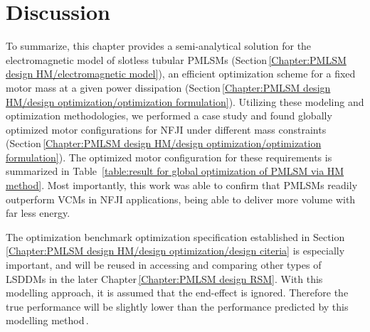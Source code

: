     \section{Discussion}                            \label{Chapter:PMLSM design HM/discussion}
    
        
        To summarize, this chapter provides a semi-analytical solution for the electromagnetic model of slotless tubular \acsp{PMLSM} (Section\,\ref{Chapter:PMLSM design HM/electromagnetic model}), an efficient optimization scheme for a fixed motor mass at a given power dissipation (Section\,\ref{Chapter:PMLSM design HM/design optimization/optimization formulation}). Utilizing these modeling and optimization methodologies, we performed a case study and found globally optimized motor configurations for \acs{NFJI} under different mass constraints (Section\,\ref{Chapter:PMLSM design HM/design optimization/optimization formulation}). The optimized motor configuration for these requirements is summarized in Table~\ref{table:result for global optimization of PMLSM via HM method}. Most importantly, this work was able to confirm that \acsp{PMLSM} readily outperform \acsp{VCM} in \acs{NFJI} applications, being able to deliver more volume with far less energy. 
        
        
        The optimization benchmark optimization specification established in Section\,\ref{Chapter:PMLSM design HM/design optimization/design citeria} is especially important, and will be reused in accessing and comparing other types of \acsp{LSDDM} in the later Chapter\,\ref{Chapter:PMLSM design RSM}. With this modelling approach, it is assumed that the end-effect is ignored. Therefore the true performance will be slightly lower than the performance predicted by this modelling method\,\cite{Ruddy2013a}.
        
        